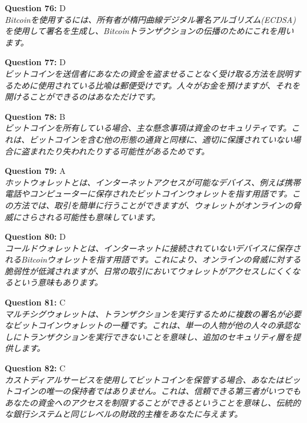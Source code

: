 \documentclass[12pt,a4paper]{article}
\begin{document}
\begin{enumerate}
{{{{{{\item \textbf{Question 76:} D
\\ \textit{Bitcoinを使用するには、所有者が楕円曲線デジタル署名アルゴリズム(ECDSA)を使用して署名を生成し、Bitcoinトランザクションの伝播のためにこれを用います。}

\item \textbf{Question 77:} D
\\ \textit{ビットコインを送信者にあなたの資金を盗ませることなく受け取る方法を説明するために使用されている比喩は郵便受けです。人々がお金を預けますが、それを開けることができるのはあなただけです。}

\item \textbf{Question 78:} B
\\ \textit{ビットコインを所有している場合、主な懸念事項は資金のセキュリティです。これは、ビットコインを含む他の形態の通貨と同様に、適切に保護されていない場合に盗まれたり失われたりする可能性があるためです。}

\item \textbf{Question 79:} A
\\ \textit{ホットウォレットとは、インターネットアクセスが可能なデバイス、例えば携帯電話やコンピューターに保存されたビットコインウォレットを指す用語です。この方法では、取引を簡単に行うことができますが、ウォレットがオンラインの脅威にさらされる可能性も意味しています。}

\item \textbf{Question 80:} D
\\ \textit{コールドウォレットとは、インターネットに接続されていないデバイスに保存されるBitcoinウォレットを指す用語です。これにより、オンラインの脅威に対する脆弱性が低減されますが、日常の取引においてウォレットがアクセスしにくくなるという意味もあります。}

\item \textbf{Question 81:} C
\\ \textit{マルチシグウォレットは、トランザクションを実行するために複数の署名が必要なビットコインウォレットの一種です。これは、単一の人物が他の人々の承認なしにトランザクションを実行できないことを意味し、追加のセキュリティ層を提供します。}

\item \textbf{Question 82:} C
\\ \textit{カストディアルサービスを使用してビットコインを保管する場合、あなたはビットコインの唯一の保持者ではありません。これは、信頼できる第三者がいつでもあなたの資金へのアクセスを制限することができるということを意味し、伝統的な銀行システムと同じレベルの財政的主権をあなたに与えます。}

}}}}}}
\end{enumerate}
\end{document}
